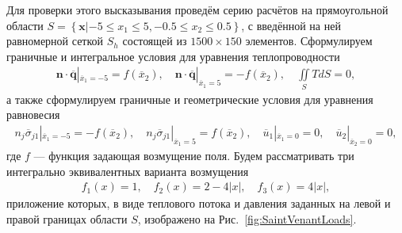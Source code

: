 Для проверки этого высказывания проведём серию расчётов на прямоугольной области $S = \left\{ \boldsymbol{x} | -5 \leqslant x_1 \leqslant 5, -0.5 \leqslant x_2 \leqslant 0.5 \right\}$, с введённой на ней равномерной сеткой $S_h$ состоящей из $1500 \times 150$ элементов. Сформулируем граничные и интегральное условия для уравнения теплопроводности
\begin{gather*}
	\boldsymbol{n} \cdot \overline{\boldsymbol{q}} |_{\overline{x}_1 = -5} = f(\overline{x}_2),
	\quad
	\boldsymbol{n} \cdot \overline{\boldsymbol{q}} |_{\overline{x}_1 = 5} = -f(\overline{x}_2),
	\quad
	\iint\limits_S T dS = 0,
\end{gather*}
а также сформулируем граничные и геометрические условия для уравнения равновесия
\begin{gather*}
	n_j \overline{\sigma}_{j1} |_{\overline{x}_1 = -5} = -f(\overline{x}_2),
	\quad
	n_j \overline{\sigma}_{j1} |_{\overline{x}_1 = 5} = f(\overline{x}_2),
	\quad
	\overline{u}_1 |_{\overline{x}_1 = 0} = 0,
	\quad
	\overline{u}_2 |_{\overline{x}_2 = 0} = 0,
\end{gather*}
где $f$ --- функция задающая возмущение поля. Будем рассматривать три интегрально эквивалентных варианта возмущения
\begin{gather*}
	f_1 (x) = 1,
	\quad
	f_2 (x) = 2 - 4 |x|,
	\quad
	f_3 (x) = 4 |x|,
\end{gather*}
приложение которых, в виде теплового потока и давления заданных на левой и правой границах области $S$, изображено на Рис.~\ref{fig:SaintVenantLoads}.

